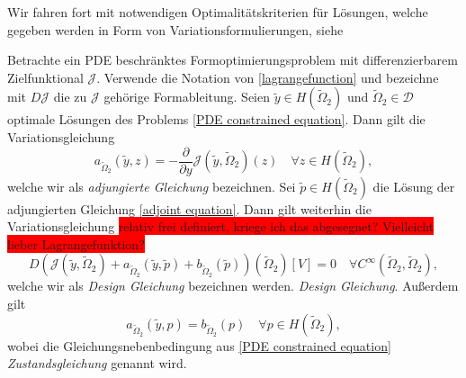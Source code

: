 Wir fahren fort mit notwendigen Optimalitätskriterien für Lösungen, welche gegeben werden in Form von Variationsformulierungen, siehe \cite{LagrangeNewton}

\begin{defi}
	Betrachte ein PDE beschränktes Formoptimierungsproblem mit differenzierbarem Zielfunktional $\mathcal{J}$. Verwende die Notation von \ref{lagrangefunction} und bezeichne mit $D\mathcal{J}$ die zu $\mathcal{J}$ gehörige Formableitung. Seien $\tilde{y} \in H(\tilde{\Omega}_2)$ und $\tilde{\Omega}_2\in \mathcal{D}$ optimale Lösungen des Problems \ref{PDE constrained equation}. Dann gilt die Variationsgleichung
\begin{equation}\label{adjoint equation}
	a_{\tilde{\Omega}_2}(\tilde{y},z) = - \frac{\partial}{\partial y} \mathcal{J}(\tilde{y},\tilde{\Omega}_2)(z) \quad \forall z\in H(\tilde{\Omega}_2),
\end{equation}
welche wir als \textit{adjungierte Gleichung} bezeichnen. Sei $\tilde{p} \in H(\tilde{\Omega}_2)$ die Lösung der adjungierten Gleichung \ref{adjoint equation}. Dann gilt weiterhin die Variationsgleichung
\colorbox{red}{ relativ frei definiert, kriege ich das abgesegnet? Vielleicht lieber Lagrangefunktion?}
\begin{equation}\label{Design equation}
	D\left(\mathcal{J}(\tilde{y},\tilde{\Omega}_2) + a_{\tilde{\Omega}_2}(\tilde{y},\tilde{p}) + b_{\tilde{\Omega}_2}(\tilde{p})\right)(\tilde{\Omega}_2)[V] = 0 \quad \forall C^\infty(\tilde{\Omega}_2,\tilde{\Omega}_2),
\end{equation}
welche wir als \textit{Design Gleichung} bezeichnen werden.
\textit{Design Gleichung}. Außerdem gilt
\begin{equation}
	a_{\tilde{\Omega}_2}(\tilde{y},p) = b_{\tilde{\Omega}_2}(p) \quad \forall p \in H(\tilde{\Omega}_2),
\end{equation}
wobei die Gleichungsnebenbedingung aus \ref{PDE constrained equation} \textit{Zustandsgleichung} genannt wird.
\end{defi}

